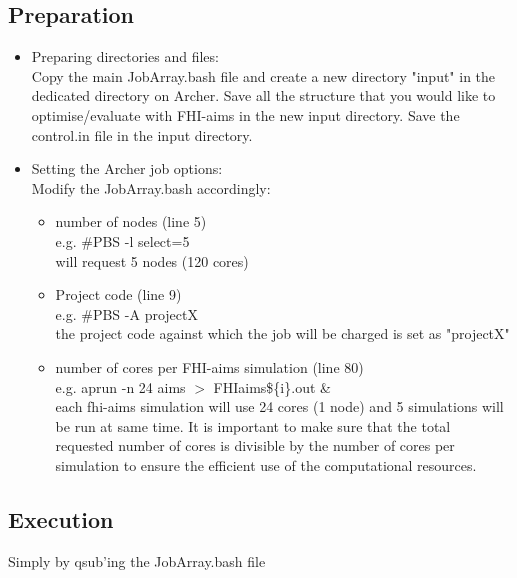 \documentclass[12pt]{article}
\begin{document}
\subsection{Preparation}
\begin{itemize}
  \item Preparing directories and files: \\
  Copy the main JobArray.bash file and create a new directory "input" in the dedicated directory on Archer. 
  Save all the structure that you would like to optimise/evaluate with FHI-aims in the new input directory. 
  Save the control.in file in the input directory.
  \item Setting the Archer job options: \\
  Modify the JobArray.bash accordingly:
  \begin{itemize}
  
  \item number of nodes (line 5) \\
  e.g. \#PBS -l select=5 \\
  will request 5 nodes (120 cores)
  
  \item Project code (line 9) \\
  e.g. \#PBS -A projectX
  \\ the project code against which the job will be charged is set as "projectX"
  
  \item number of cores per FHI-aims simulation (line 80) \\
  e.g. aprun -n 24 aims $>$ FHIaims\$\{i\}.out \&
  \\  each fhi-aims simulation will use 24 cores (1 node) and 5 simulations will be run at same time. It is important to make sure that the total requested number of cores is divisible by the number of cores per simulation to ensure the efficient use of the computational resources.
  
  \end{itemize}
\end{itemize}

\subsection{Execution}

Simply by qsub'ing the JobArray.bash file
\end{document}
